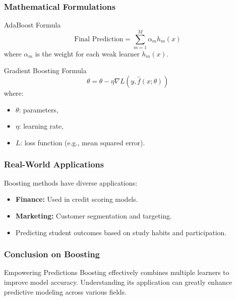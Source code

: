 \documentclass[aspectratio=169]{beamer}
\begin{document}
\begin{frame}[fragile]
    \frametitle{Mathematical Formulations}
    \begin{block}{AdaBoost Formula}
        \begin{equation}
            \text{Final Prediction} = \sum_{m=1}^{M} \alpha_m h_m(x) 
        \end{equation}
        where $\alpha_m$ is the weight for each weak learner $h_m(x)$.
    \end{block}
    
    \begin{block}{Gradient Boosting Formula}
        \begin{equation}
            \theta = \theta - \eta \nabla L(y, \hat{f}(x; \theta)) 
        \end{equation}
        where:
        \begin{itemize}
            \item $\theta$: parameters,
            \item $\eta$: learning rate,
            \item $L$: loss function (e.g., mean squared error).
        \end{itemize}
    \end{block}    
\end{frame}

\begin{frame}[fragile]
    \frametitle{Real-World Applications}
    Boosting methods have diverse applications:
    \begin{itemize}
        \item \textbf{Finance:} Used in credit scoring models.
        \item \textbf{Marketing:} Customer segmentation and targeting.
        \item Predicting student outcomes based on study habits and participation.
    \end{itemize}
\end{frame}

\begin{frame}[fragile]
    \frametitle{Conclusion on Boosting}
    \begin{block}{Empowering Predictions}
        Boosting effectively combines multiple learners to improve model accuracy. Understanding its application can greatly enhance predictive modeling across various fields.
    \end{block}
\end{frame}
\end{document}
